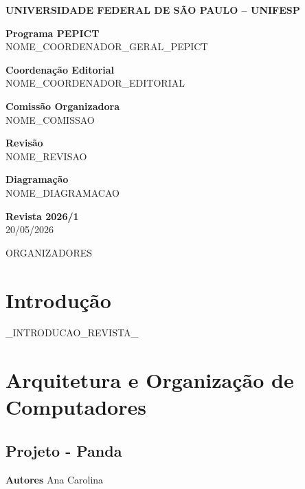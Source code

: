 \documentclass[12pt,openright,oneside,a4paper]{report}
\begin{document}
\begin{flushleft}
{\large \textbf{UNIVERSIDADE FEDERAL DE SÃO PAULO – UNIFESP}}
\vspace{1cm}

\textbf{Programa PEPICT} \\
NOME_COORDENADOR_GERAL_PEPICT
\vspace{0.7cm}

\textbf{Coordenação Editorial} \\
NOME_COORDENADOR_EDITORIAL
\vspace{0.7cm}

\textbf{Comissão Organizadora} \\
NOME_COMISSAO
\vspace{0.7cm}

\textbf{Revisão} \\
NOME_REVISAO
\vspace{0.7cm}

\textbf{Diagramação} \\
NOME_DIAGRAMACAO
\vspace{1.5cm}

\textbf{\large Revista 2026/1} \\
20/05/2026
\vspace{0.5cm}

ORGANIZADORES
\end{flushleft}
\clearpage

\tableofcontents
\clearpage

\chapter{Introdução}
_INTRODUCAO_REVISTA_
\clearpage

\chapter{Arquitetura e Organização de Computadores}

\section{Projeto - Panda}
\noindent
\textbf{Autores}
Ana Carolina
\end{document}
